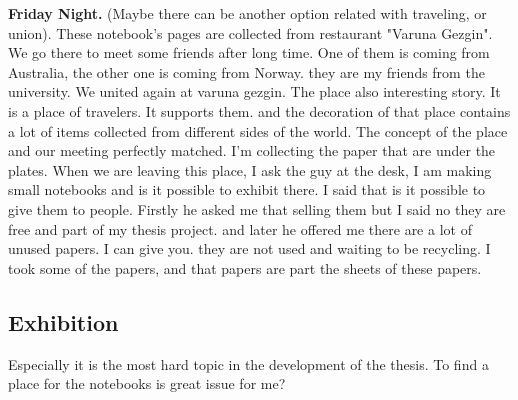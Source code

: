 {\textbf{Friday Night.} (Maybe there can be another option related with traveling, or union). These notebook's pages are collected from restaurant "Varuna Gezgin". We go there to meet some friends after long time. One of them is coming from Australia, the other one is coming from Norway. they are my friends from the university. We united again at varuna gezgin. The place also interesting story. It is a place of travelers. It supports them. and the decoration of that place contains a lot of items collected from different sides of the world. The concept of the place and our meeting perfectly matched. I'm collecting the paper that are under the plates. When we are leaving this place, I ask the guy at the desk, I am making small notebooks and is it possible to exhibit there. I said that is it possible to give them to people. Firstly he asked me that selling them but I said no they are free and part of my thesis project. and later he offered me there are a lot of unused papers. I can give you. they are not used and waiting to be recycling. I took some of the papers, and that papers are part the sheets of these papers.










%
%
\subsection{Exhibition}
Especially it is the most hard topic in the development of the thesis. To find a place for the notebooks is great issue for me?

}
